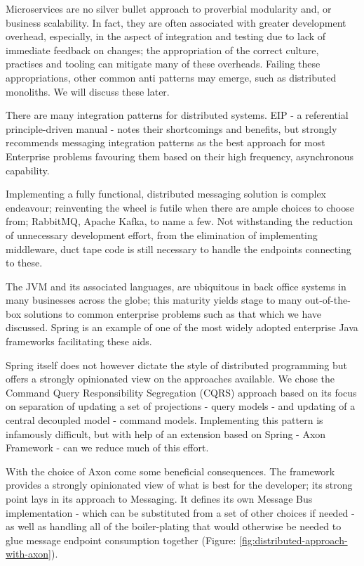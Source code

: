 Microservices are no silver bullet approach to proverbial modularity and, or business scalability. In fact, they are often associated with greater development overhead, especially, in the aspect of integration and testing due to lack of immediate feedback on changes; the appropriation of the correct culture, practises and tooling can mitigate many of these overheads. Failing these appropriations, other common anti patterns may emerge, such as distributed monoliths. We will discuss these later.

There are many integration patterns for distributed systems. EIP - a referential principle-driven manual - notes their shortcomings and benefits, but strongly recommends messaging integration patterns as the best approach for most Enterprise problems favouring them based on their high frequency, asynchronous capability.

Implementing a fully functional, distributed messaging solution is complex endeavour; reinventing the wheel is futile when there are ample choices to choose from; RabbitMQ, Apache Kafka, to name a few. Not withstanding the reduction of unnecessary development effort, from the elimination of implementing middleware, duct tape code is still necessary to handle the endpoints connecting to these.

The JVM and its associated languages, are ubiquitous in back office systems in many businesses across the globe; this maturity yields stage to many out-of-the-box solutions to common enterprise problems such as that which we have discussed. Spring is an example of one of the most widely adopted enterprise Java frameworks facilitating these aids.

Spring itself does not however dictate the style of distributed programming but offers a strongly opinionated view on the approaches available. We chose the Command Query Responsibility Segregation (CQRS) approach based on its focus on separation of updating a set of projections - query models - and updating of a central decoupled model - command models. Implementing this pattern is infamously difficult, but with help of an extension based on Spring - Axon Framework - can we reduce much of this effort.  

With the choice of Axon come some beneficial consequences. The framework provides a strongly opinionated view of what is best for the developer; its strong point lays in its approach to Messaging. It defines its own Message Bus implementation - which can be substituted from a set of other choices if needed - as well as handling all of the boiler-plating that would otherwise be needed to glue message endpoint consumption together (Figure: \ref{fig:distributed-approach-with-axon}).

